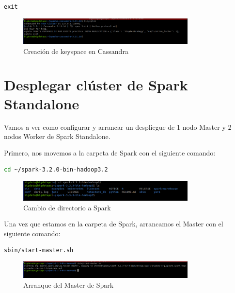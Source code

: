 \begin{lstlisting}[language=sql]
    exit
\end{lstlisting}

\begin{figure}[H]
    \centering
    \includegraphics[width=0.8\textwidth]{figures/13.png}
    \caption{Creación de keyspace en Cassandra}
\end{figure}

\section{Desplegar clúster de Spark Standalone}

Vamos a ver como configurar y arrancar un despliegue de 1 nodo Master y 2 nodos Worker de Spark Standalone.

Primero, nos movemos a la carpeta de Spark con el siguiente comando:

\begin{lstlisting}[language=bash]
    cd ~/spark-3.2.0-bin-hadoop3.2
\end{lstlisting}

\begin{figure}[H]
    \centering
    \includegraphics[width=0.8\textwidth]{figures/14.png}
    \caption{Cambio de directorio a Spark}
\end{figure}

Una vez que estamos en la carpeta de Spark, arrancamos el Master con el siguiente comando:

\begin{lstlisting}[language=bash]
    sbin/start-master.sh
\end{lstlisting}

\begin{figure}[H]
    \centering
    \includegraphics[width=0.8\textwidth]{figures/15.png}
    \caption{Arranque del Master de Spark}
\end{figure}

